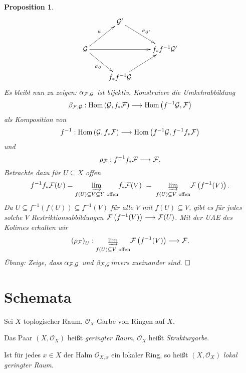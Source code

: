 \documentclass[11pt]{book}
\newtheorem{proposition}[theorem]{Proposition}
\theoremstyle{nonumberbreak}
\newenvironment{defin}[1][]{\ifthenelse{\equal{#1}{}}{\definition}{\definition[#1]}\rm}{\enddefinition}
\newenvironment{pr}[1][]{\ifthenelse{\equal{#1}{}}{\proof}{\proof[#1]}\rm}{\endproof}
\newcommand{\Hom}{\mathrm{Hom} }
\begin{document}
\begin{spacing}{1.4}
\begin{proposition}
\begin{pr}
$$
\begin{xy}
\xymatrix{
& \G' \ar[rd]^{\sigma_{\G'}} & \\ 
\G \ar[rr] \ar[rd]_{\sigma_{\G}} \ar[ru]^{\psi} && f_{*} f^{-1} \G' \\ 
& f_* f^{-1} \G \ar[ru] & 
}
\end{xy}
$$
Es bleibt nun zu zeigen: $\alpha_{\mathcal{F}, \mathcal{G}}$ ist bijektiv. Konstruiere die Umkehrabbildung
$$\beta_{\F, \G}: \Hom\left( \G, f_{*} \F \right) \longrightarrow \Hom\left( f^{-1} \G, \F \right)$$
als Komposition von 
$$f^{-1}: \Hom\left(\G, f_* \F \right) \longrightarrow \Hom\left(f^{-1}\G, f^{-1} f_* \F \right)$$
und
$$\rho_{\mathcal{F}}: f^{-1} f_* \mathcal{F} \longrightarrow \mathcal{F}.$$
Betrachte dazu für $U\subseteq X$ offen
$$f^{-1}f_* \mathcal{F}(U) =  \underset{f(U) \subseteq V \subseteq Y \textrm{ offen}}{\underrightarrow{\textrm{lim}}} f_* \mathcal{F}(V) \ =\  \underset{f(U) \subseteq V \textrm{ offen}}{\underrightarrow{\textrm{lim}}} \mathcal{F} \left( f^{-1}(V) \right) .$$
Da $U \subseteq f^{-1} \left(f(U) \right) \subseteq f^{-1}(V)$ für alle $V$ mit $f(U) \subseteq V$, gibt es für jedes solche $V$ Restriktionsabbildungen
$\mathcal{F}\left(f^{-1}(V)\right) \longrightarrow \mathcal{F}(U)$. Mit der UAE des Kolimes erhalten wir
$$\left(\rho_{\mathcal{F}}\right)_U: \underset{f(U) \subseteq V \textrm{ offen}}{\underrightarrow{\textrm{lim}}} \mathcal{F} \left( f^{-1}(V) \right) \longrightarrow \mathcal{F}.$$
Übung: Zeige, dass $\alpha_{\mathcal{F}, \mathcal{G}}$ und $\beta_{\mathcal{F}, \mathcal{G}}$invers zueinander sind. $\hfill \Box$

\end{pr}

\end{proposition}



\renewcommand*\thesection{§ \arabic{section}\quad}
\section{Schemata} %
\renewcommand*\thesection{\arabic{section}}

\begin{defin}  %
Sei $X$ toplogischer Raum, $\mathcal{O}_X$ Garbe von Ringen auf $X$.
\begin{compactenum}
\item Das Paar $\left(X, \mathcal{O}_X\right)$ heißt \textit{geringter Raum}, $\mathcal{O}_X$ heißt \textit{Strukturgarbe}.
\item Ist für jedes $x \in X$ der Halm $\mathcal{O}_{X,x}$ ein lokaler Ring, so heißt $\left(X, \mathcal{O}_X\right)$ \textit{lokal geringter Raum}.
\end{compactenum}
\end{defin}


\end{spacing}
\end{document}
